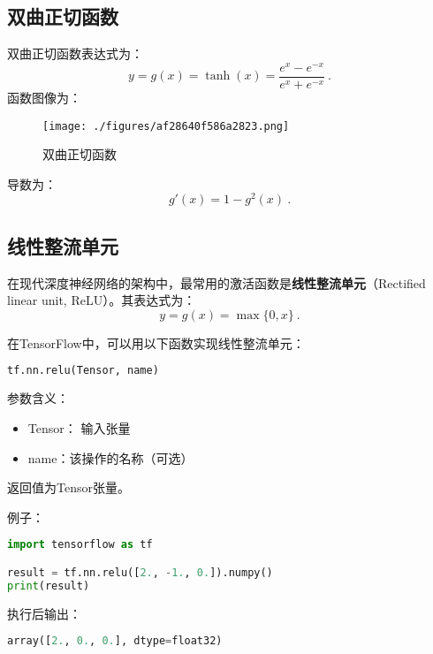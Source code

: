 \subsection{双曲正切函数}
双曲正切函数表达式为：
\begin{equation}
y=g(x)=\tanh(x)=\frac{e^x-e^{-x}}{e^x+e^{-x}}~.
\end{equation}
函数图像为：
\begin{figure}[ht]
\centering
\texttt{[image: ./figures/af28640f586a2823.png]}
\caption{双曲正切函数} \label{fig_ActFun3}
\end{figure}
导数为：
\begin{equation}
g'(x)=1-g^2(x)~.
\end{equation}

\subsection{线性整流单元}
在现代深度神经网络的架构中，最常用的激活函数是\textbf{线性整流单元}（Rectified linear unit, ReLU）。其表达式为：
\begin{equation}
y=g(x)=\max\{0,x\}~.
\end{equation}

在TensorFlow中，可以用以下函数实现线性整流单元：
\begin{lstlisting}[language=python]
tf.nn.relu(Tensor, name)
\end{lstlisting}

参数含义：
\begin{itemize}
\item Tensor： 输入张量 \\
\item name：该操作的名称（可选） \\
\end{itemize}
返回值为Tensor张量。

例子：
\begin{lstlisting}[language=python]
import tensorflow as tf

result = tf.nn.relu([2., -1., 0.]).numpy()
print(result)
\end{lstlisting}
执行后输出：
\begin{lstlisting}[language=python]
array([2., 0., 0.], dtype=float32)
\end{lstlisting}